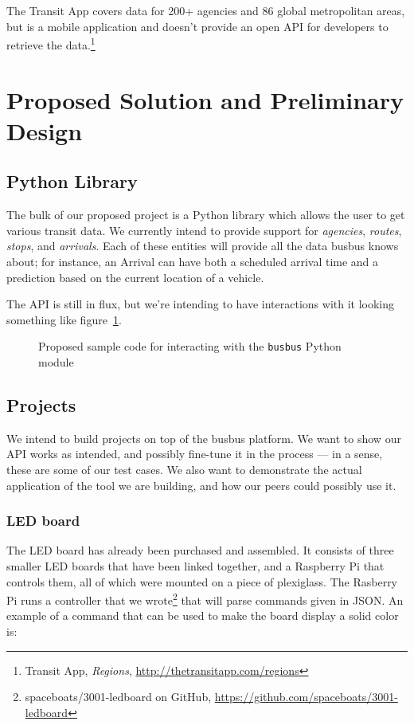 \documentclass[12pt]{article}
\begin{document}
The Transit App covers data for 200+ agencies
and 86 global metropolitan areas, but is a mobile application and doesn't provide an open API for developers to retrieve the
data.\footnote{Transit App, \textit{Regions}, \url{http://thetransitapp.com/regions}}


\section{Proposed Solution and Preliminary Design}
\subsection{Python Library}
The bulk of our proposed project is a Python library which allows the user to get various transit data.
We currently intend to provide support for \textit{agencies}, \textit{routes}, \textit{stops}, and \textit{arrivals}.
Each of these entities will provide all the data busbus knows about; for instance, an Arrival can have both a scheduled arrival time
and a prediction based on the current location of a vehicle.

The API is still in flux, but we're intending to have interactions with it looking something like figure~\ref{fig:pythonsample}.

\begin{figure}[h]
	\begin{center}
		
	\end{center}
	\caption{Proposed sample code for interacting with the \texttt{busbus} Python module}
	\label{fig:pythonsample}
\end{figure}

\subsection{Projects}
We intend to build projects on top of the busbus platform.
We want to show our API works as intended, and possibly
fine-tune it in the process --- in a sense, these are some of our test cases. We also want
to demonstrate the actual application of the tool we are building, and how our peers
could possibly use it.

\subsubsection{LED board}
The LED board has already been purchased and assembled. It consists of three smaller LED boards that have been linked together, and a Raspberry Pi that controls them,
all of which were mounted on a piece of plexiglass.
The Rasberry Pi runs a controller that we wrote\footnote{spaceboats/3001-ledboard on GitHub, \url{https://github.com/spaceboats/3001-ledboard}}
that will parse commands given in JSON.
An example of a command that can be used to
make the board display a solid color is:
\end{document}
